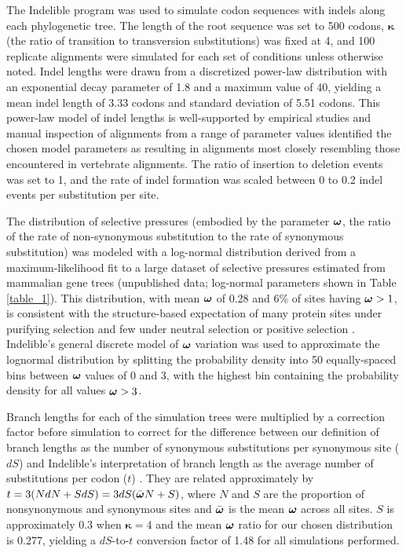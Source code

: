 \documentclass{mbe}
\begin{document}
The Indelible program \citep{Fletcher2009INDELible} was used to
simulate codon sequences with indels along each phylogenetic tree. The
length of the root sequence was set to 500 codons, $\bm{\kappa}$ (the
ratio of transition to transversion substitutions) was fixed at 4, and
100 replicate alignments were simulated for each set of conditions
unless otherwise noted. Indel lengths were drawn from a discretized
power-law distribution with an exponential decay parameter of 1.8 and
a maximum value of 40, yielding a mean indel length of 3.33 codons and
standard deviation of 5.51 codons. This power-law model of indel
lengths is well-supported by empirical studies
\citep{Benner1993Empirical,Cartwright2009Problems} and manual
inspection of alignments from a range of parameter values identified
the chosen model parameters as resulting in alignments most closely
resembling those encountered in vertebrate alignments. The ratio of
insertion to deletion events was set to 1, and the rate of indel
formation was scaled between 0 to 0.2 indel events per substitution
per site.

The distribution of \sw selective pressures (embodied by the parameter
$\bm{\omega}$, the ratio of the rate of non-synonymous substitution to the
rate of synonymous substitution) was modeled with a log-normal
distribution derived from a maximum-likelihood fit to a large dataset
of \sw selective pressures estimated from mammalian gene trees
(unpublished data; log-normal parameters shown in Table
\ref{table_1}). This distribution, with mean $\bm{\omega}$ of 0.28 and 6\% of
sites having $\bm{\omega}>1$, is consistent with the structure-based
expectation of many protein sites under purifying selection and few
under neutral selection or positive selection
\citep{Smith1970Natural,Kimura1974SomePrinciples}. Indelible's general
discrete model of \sw $\bm{\omega}$ variation was used to approximate the
lognormal distribution by splitting the probability density into 50
equally-spaced bins between $\bm{\omega}$ values of 0 and 3, with the highest
bin containing the probability density for all values $\bm{\omega}>3$.

Branch lengths for each of the simulation trees were multiplied by a
correction factor before simulation to correct for the difference
between our definition of branch lengths as the number of synonymous
substitutions per synonymous site ($dS$) and Indelible's
interpretation of branch length as the average number of substitutions
per codon ($t$) \citep{Fletcher2010Effect}. They are related
approximately by $t=3(NdN+SdS) = 3dS(\bar{\bm{\omega}{}}N+S)$, where $N$ and
$S$ are the proportion of nonsynonymous and synonymous sites and
$\bar{\bm{\omega}}$ is the mean $\bm{\omega}$ across all sites. $S$ is approximately 0.3
when $\bm{\kappa}=4$ \citep{Yang1998Synonymous} and the mean $\bm{\omega}$ ratio for our chosen
distribution is 0.277, yielding a $dS$-to-$t$ conversion factor of
1.48 for all simulations performed.
\end{document}
